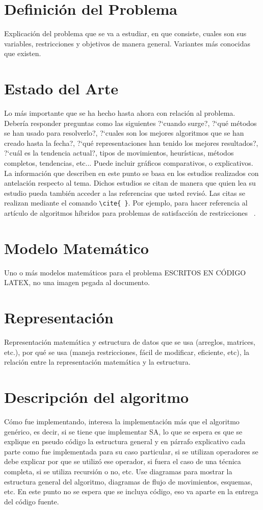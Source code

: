 \documentclass[letter, 10pt]{article}
\begin{document}
\section{Definici\'on del Problema}
Explicaci\'on del problema que se va a estudiar, en que consiste, cuales son sus variables, restricciones y objetivos de manera general. Variantes m\'as conocidas que existen.

\section{Estado del Arte}
Lo m\'as importante que se ha hecho hasta ahora con relaci\'on al problema. Deber\'ia responder preguntas como las siguientes ?`cuando surge?, ?`qu\'e m\'etodos se han usado para resolverlo?, ?`cuales son los mejores algoritmos que se han creado hasta la fecha?, ?`qu\'e representaciones han tenido los mejores resultados?, ?`cu\'al es la tendencia actual?, tipos de movimientos, heur\'isticas, m\'etodos completos, tendencias, etc... Puede incluir gr\'aficos comparativos, o explicativos.\\
La informaci\'on que describen en este punto se basa en los estudios realizados con antelaci\'on respecto al tema. Dichos estudios se citan de manera que quien lea su estudio pueda tambi\'en
 acceder a las referencias que usted revis\'o. Las citas se realizan mediante el comando \verb+\cite{ }+.
Por ejemplo, para hacer referencia al art\'iculo de algoritmos h\'ibridos para problemas de satisfacci\'on 
 de restricciones ~\cite{Prosser93Hybrid}.

\section{Modelo Matem\'atico}
Uno o m\'as modelos matem\'aticos para el problema ESCRITOS EN C\'ODIGO LATEX, no una imagen pegada al documento.

\section{Representaci\'on}
Representaci\'on matem\'atica y estructura de datos que se usa (arreglos, matrices, etc.), por qu\'e se usa (maneja restricciones, f\'acil de modificar, eficiente, etc), la relaci\'on entre la representaci\'on matem\'atica y la estructura.

\section{Descripci\'on del algoritmo}
C\'omo fue implementando, interesa la implementaci\'on m\'as que el algoritmo gen\'erico, es decir,
si se tiene que implementar SA, lo que se espera es que se explique en pseudo c\'odigo la estructura
general y en p\'arrafo explicativo cada parte como fue implementada para su caso particular, si
se utilizan operadores se debe explicar por que se utiliz\'o ese operador, si fuera el caso de una
t\'ecnica completa, si se utiliza recursi\'on o no, etc. Use diagramas para mostrar la estructura general del algoritmo, diagramas de flujo de movimientos, esquemas, etc. En este punto no se espera que se incluya c\'odigo, eso va aparte en la entrega del c\'odigo fuente.
\end{document}
